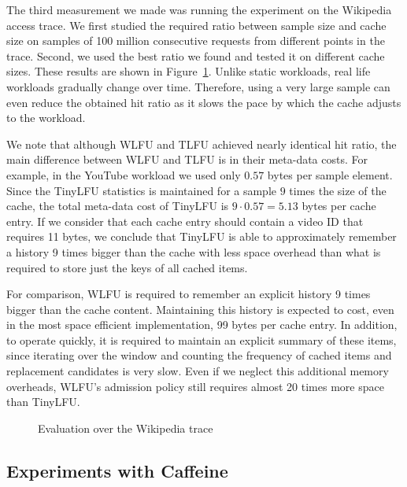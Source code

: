 \documentclass[10pt,a4paper]{article}
\begin{document}
The third measurement we made was running the experiment on the Wikipedia access trace.
We first studied the required ratio between sample size and cache size on samples of 100 million consecutive requests from different points in the trace.
Second, we used the best ratio we found and tested it on different cache sizes. These results are shown in Figure~\ref{fig:Wiki}. Unlike static workloads, real life workloads
gradually change over time. Therefore, using a very large sample can even reduce the obtained hit ratio as it slows the pace by which the cache adjusts to the workload.


We note that although WLFU and TLFU achieved nearly identical hit ratio, the main difference between WLFU and TLFU is in their meta-data costs.
For example, in the YouTube workload we used only $0.57$ bytes per sample element.
Since the TinyLFU statistics is maintained for a sample $9$ times the size of the cache, the total meta-data cost of TinyLFU is $9 \cdot 0.57 = 5.13$ bytes per cache entry.
If we consider that each cache entry should contain a video ID that requires 11 bytes, we conclude that TinyLFU is able to approximately remember a history 9 times bigger than the cache
with less space overhead than what is required to store just the keys of all cached items.

For comparison, WLFU is required to remember an explicit history 9 times bigger than the cache content.
Maintaining this history is expected to cost, even in the most space efficient implementation, 99 bytes per cache entry.
In addition, to operate quickly, it is required to maintain an explicit summary of these items, since iterating over the window and counting the frequency of cached items and replacement candidates is very slow.
Even if we neglect this additional memory overheads, WLFU's admission policy still requires almost 20 times more space than TinyLFU.

\begin{figure}[t]
\caption{Evaluation over the Wikipedia trace}
\label{fig:Wiki}
\end{figure}

\subsection{Experiments with Caffeine}
\label{sec:realruns}
\end{document}

